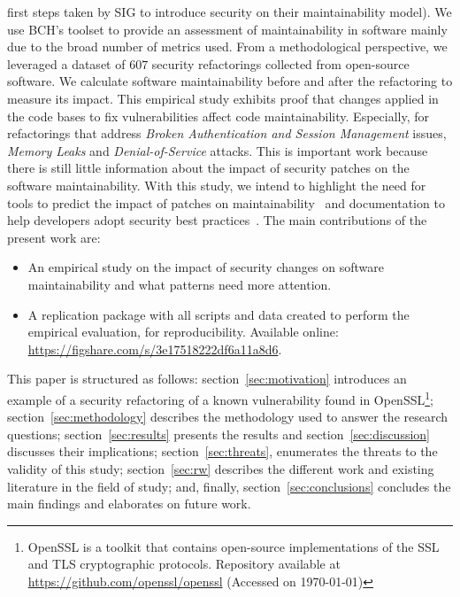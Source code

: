 \documentclass[sigconf,review]{acmart}
\begin{document}
first steps taken by SIG to introduce security on their maintainability model). 
%
We use BCH's toolset to provide an assessment of maintainability in 
software mainly due to the broad number of metrics used.
From a methodological 
perspective, we leveraged a dataset of $607$ security refactorings collected from open-source 
software. We calculate software maintainability before and after the refactoring to measure its 
impact. This empirical study exhibits proof that changes 
applied in the code bases to fix vulnerabilities affect code maintainability. 
Especially, for refactorings that address \emph{Broken Authentication and Session Management} 
issues, \emph{Memory Leaks} and \emph{Denial-of-Service} attacks. This is important work
because there is still little information about the impact of security patches on the software
maintainability. With this study, 
we intend to highlight the need for tools to predict the impact of patches on 
maintainability~\cite{4724577} and documentation to help developers adopt security 
best practices~\cite{6311252, 7927935, MESQUIDA201519}.
%
%
The main contributions of the present work are:
%
\begin{itemize}
	\item An empirical study on the impact of security changes on software
	maintainability and what patterns need more attention.
	\item A replication package with all scripts and data created to perform the
	empirical evaluation, for reproducibility. Available online:
  \url{https://figshare.com/s/3e17518222df6a11a8d6}.
\end{itemize}
%
This paper is structured as follows: section~\ref{sec:motivation} introduces an
example of a security refactoring of a known vulnerability found in
OpenSSL\footnote{\label{openssl}OpenSSL is a toolkit that
contains open-source implementations of the SSL and TLS cryptographic
protocols. Repository available at \url{https://github.com/openssl/openssl}
(Accessed on \today{})}; section~\ref{sec:methodology} describes the
methodology used to answer the research questions; section~\ref{sec:results}
presents the results and section~\ref{sec:discussion} discusses their
implications; section~\ref{sec:threats}, enumerates the threats to the validity of
this study; section~\ref{sec:rw} describes the different work and existing
literature in the field of study; and, finally, section~\ref{sec:conclusions}
concludes the main findings and elaborates on future work.
%
\end{document}
